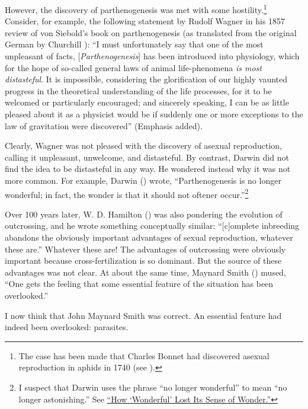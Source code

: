 \documentclass[
  letterpaper,
]{book}
\begin{document}
However, the discovery of parthenogenesis was met with some
hostility.\footnote{The case has been made that Charles Bonnet had
  discovered asexual reproduction in aphids in 1740 (see
  ).} Consider, for example,
the following statement by Rudolf Wagner in his 1857 review of von
Siebold's book on parthenogenesis (as translated from the original
German by Churchill ): ``I must
unfortunately say that one of the most unpleasant of facts,
{[}\emph{Parthenogenesis}{]} has been introduced into physiology, which
for the hope of so-called general laws of animal life-phenomena \emph{is
most distasteful}. It is impossible, considering the glorification of
our highly vaunted progress in the theoretical understanding of the life
processes, for it to be welcomed or particularly encouraged; and
sincerely speaking, I can be as little pleased about it as a physicist
would be if suddenly one or more exceptions to the law of gravitation
were discovered'' (Emphasis added).

Clearly, Wagner was not pleased with the discovery of asexual
reproduction, calling it unpleasant, unwelcome, and distasteful. By
contrast, Darwin did not find the idea to be distasteful in any way. He
wondered instead why it was not more common. For example, Darwin
() wrote, ``Parthenogenesis is no longer
wonderful; in fact, the wonder is that it should not oftener
occur.''\footnote{I suspect that Darwin uses the phrase ``no longer
  wonderful'' to mean ``no longer astonishing.'' See
  \href{https://www.merriam-webster.com/words-at-play/wonderful-word-history-evolution}{``How
  `Wonderful' Lost Its Sense of Wonder.''}}

Over 100 years later, W. D. Hamilton
() was also pondering the evolution
of outcrossing, and he wrote something conceptually similar:
``{[}c{]}omplete inbreeding abandons the obviously important advantages
of sexual reproduction, whatever these are.'' Whatever these are! The
advantages of outcrossing were obviously important because
cross-fertilization is so dominant. But the source of these advantages
was not clear. At about the same time, Maynard Smith
() mused, ``One gets the feeling that
some essential feature of the situation has been overlooked.''

I now think that John Maynard Smith was correct. An essential feature
had indeed been overlooked: parasites.
\end{document}
